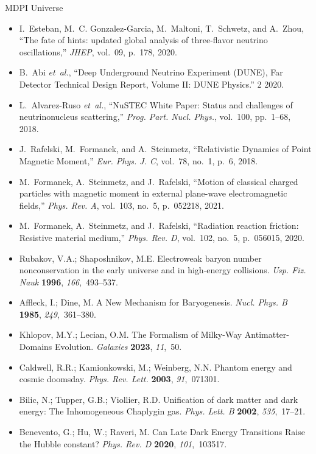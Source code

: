 \documentclass[a4paper, 10pt]{letter}
\begin{document}
\begin{letter}{MDPI Universe}
\begin{itemize}
    \item I.~Esteban, M.~C. Gonzalez-Garcia, M.~Maltoni, T.~Schwetz, and A.~Zhou, ``{The fate of hints: updated global analysis of three-flavor neutrino oscillations},'' {\em JHEP}, vol.~09, p.~178, 2020.
    \item B.~Abi {\em et~al.}, ``{Deep Underground Neutrino Experiment (DUNE), Far Detector Technical Design Report, Volume II: DUNE Physics}.'' 2 2020.
    \item L.~Alvarez-Ruso {\em et~al.}, ``{NuSTEC White Paper: Status and challenges of neutrino\textendash{}nucleus scattering},'' {\em Prog. Part. Nucl. Phys.}, vol.~100, pp.~1--68, 2018.
    \item J.~Rafelski, M.~Formanek, and A.~Steinmetz, ``{Relativistic Dynamics of Point Magnetic Moment},'' {\em Eur. Phys. J. C}, vol.~78, no.~1, p.~6, 2018.
    \item M.~Formanek, A.~Steinmetz, and J.~Rafelski, ``{Motion of classical charged particles with magnetic moment in external plane-wave electromagnetic fields},'' {\em Phys. Rev. A}, vol.~103, no.~5, p.~052218, 2021.
    \item M.~Formanek, A.~Steinmetz, and J.~Rafelski, ``{Radiation reaction friction: Resistive material medium},'' {\em Phys. Rev. D}, vol.~102, no.~5, p.~056015, 2020.
    \item Rubakov, V.A.; Shaposhnikov, M.E. {Electroweak baryon number nonconservation in the early universe and  in high-energy collisions}. {\em Usp. Fiz. Nauk} {\bf 1996}, {\em 166},~493--537.
    \item Affleck, I.; Dine, M. {A New Mechanism for Baryogenesis}. {\em Nucl. Phys. B} {\bf 1985}, {\em 249},~361--380.
    \item Khlopov, M.Y.; Lecian, O.M. {The Formalism of Milky-Way Antimatter-Domains Evolution}. {\em Galaxies} {\bf 2023}, {\em 11},~50.
    \item Caldwell, R.R.; Kamionkowski, M.; Weinberg, N.N. {Phantom energy and cosmic doomsday}. {\em Phys. Rev. Lett.} {\bf 2003}, {\em 91},~071301.
    \item Bilic, N.; Tupper, G.B.; Viollier, R.D. {Unification of dark matter and dark energy: The Inhomogeneous Chaplygin gas}. {\em Phys. Lett. B} {\bf 2002}, {\em 535},~17--21.
    \item Benevento, G.; Hu, W.; Raveri, M. {Can Late Dark Energy Transitions Raise the Hubble constant?} {\em Phys. Rev. D} {\bf 2020}, {\em 101},~103517.
\end{itemize}


\end{letter}
\end{document}
